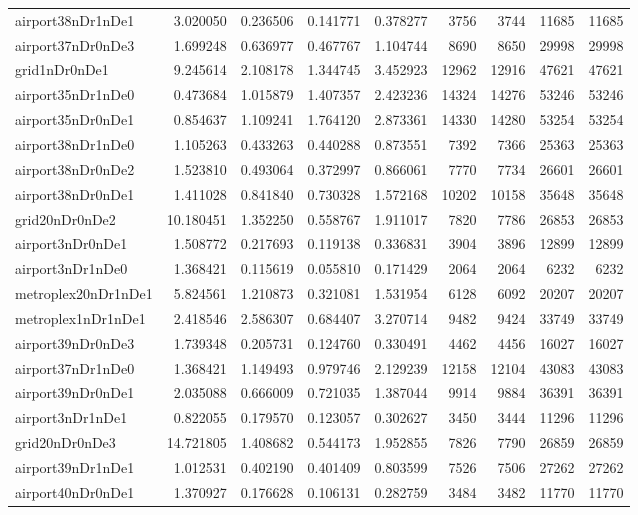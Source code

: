 \begin{longtable}{|l|r|r|r|r|r|r|r|r|}
airport38nDr1nDe1 & 3.020050 & 0.236506 & 0.141771 & 0.378277 & 3756 & 3744 & 11685 & 11685 \\
airport37nDr0nDe3 & 1.699248 & 0.636977 & 0.467767 & 1.104744 & 8690 & 8650 & 29998 & 29998 \\
grid1nDr0nDe1 & 9.245614 & 2.108178 & 1.344745 & 3.452923 & 12962 & 12916 & 47621 & 47621 \\
airport35nDr1nDe0 & 0.473684 & 1.015879 & 1.407357 & 2.423236 & 14324 & 14276 & 53246 & 53246 \\
airport35nDr0nDe1 & 0.854637 & 1.109241 & 1.764120 & 2.873361 & 14330 & 14280 & 53254 & 53254 \\
airport38nDr1nDe0 & 1.105263 & 0.433263 & 0.440288 & 0.873551 & 7392 & 7366 & 25363 & 25363 \\
airport38nDr0nDe2 & 1.523810 & 0.493064 & 0.372997 & 0.866061 & 7770 & 7734 & 26601 & 26601 \\
airport38nDr0nDe1 & 1.411028 & 0.841840 & 0.730328 & 1.572168 & 10202 & 10158 & 35648 & 35648 \\
grid20nDr0nDe2 & 10.180451 & 1.352250 & 0.558767 & 1.911017 & 7820 & 7786 & 26853 & 26853 \\
airport3nDr0nDe1 & 1.508772 & 0.217693 & 0.119138 & 0.336831 & 3904 & 3896 & 12899 & 12899 \\
airport3nDr1nDe0 & 1.368421 & 0.115619 & 0.055810 & 0.171429 & 2064 & 2064 & 6232 & 6232 \\
metroplex20nDr1nDe1 & 5.824561 & 1.210873 & 0.321081 & 1.531954 & 6128 & 6092 & 20207 & 20207 \\
metroplex1nDr1nDe1 & 2.418546 & 2.586307 & 0.684407 & 3.270714 & 9482 & 9424 & 33749 & 33749 \\
airport39nDr0nDe3 & 1.739348 & 0.205731 & 0.124760 & 0.330491 & 4462 & 4456 & 16027 & 16027 \\
airport37nDr1nDe0 & 1.368421 & 1.149493 & 0.979746 & 2.129239 & 12158 & 12104 & 43083 & 43083 \\
airport39nDr0nDe1 & 2.035088 & 0.666009 & 0.721035 & 1.387044 & 9914 & 9884 & 36391 & 36391 \\
airport3nDr1nDe1 & 0.822055 & 0.179570 & 0.123057 & 0.302627 & 3450 & 3444 & 11296 & 11296 \\
grid20nDr0nDe3 & 14.721805 & 1.408682 & 0.544173 & 1.952855 & 7826 & 7790 & 26859 & 26859 \\
airport39nDr1nDe1 & 1.012531 & 0.402190 & 0.401409 & 0.803599 & 7526 & 7506 & 27262 & 27262 \\
airport40nDr0nDe1 & 1.370927 & 0.176628 & 0.106131 & 0.282759 & 3484 & 3482 & 11770 & 11770 \\

\end{longtable}
